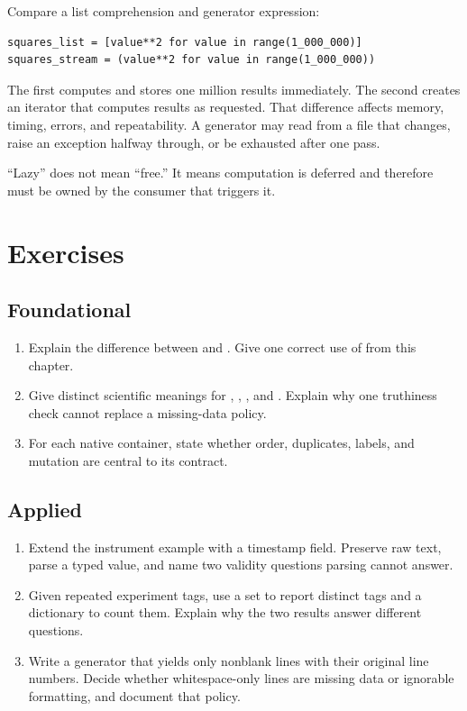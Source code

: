 Compare a list comprehension and generator expression:

\begin{lstlisting}
squares_list = [value**2 for value in range(1_000_000)]
squares_stream = (value**2 for value in range(1_000_000))
\end{lstlisting}

The first computes and stores one million results immediately. The second
creates an iterator that computes results as requested. That difference affects
memory, timing, errors, and repeatability. A generator may read from a file that
changes, raise an exception halfway through, or be exhausted after one pass.

``Lazy'' does not mean ``free.'' It means computation is deferred and therefore
must be owned by the consumer that triggers it.


\section{Exercises}

\subsection*{Foundational}
\begin{enumerate}
  \item Explain the difference between \code{==} and . Give one correct
  use of  from this chapter.
  \item Give distinct scientific meanings for , ,
  , and . Explain why one truthiness check cannot replace
  a missing-data policy.
  \item For each native container, state whether order, duplicates, labels, and
  mutation are central to its contract.
\end{enumerate}

\subsection*{Applied}
\begin{enumerate}
  \item Extend the instrument example with a timestamp field. Preserve raw text,
  parse a typed value, and name two validity questions parsing cannot answer.
  \item Given repeated experiment tags, use a set to report distinct tags and a
  dictionary to count them. Explain why the two results answer different
  questions.
  \item Write a generator that yields only nonblank lines with their original
  line numbers. Decide whether whitespace-only lines are missing data or
  ignorable formatting, and document that policy.
\end{enumerate}

